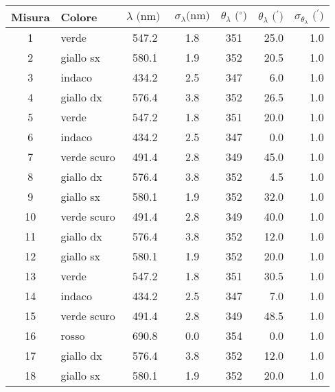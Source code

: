 \begin{table}[!htbp]
    {\par\centering
    \begin{tabular}{clcccrr}
        \hline
            Misura & 
            Colore & 
            $\lambda \text{ (nm) }$ & 
            $\sigma_{\lambda} \text{(nm)}$ & 
            $\theta_{\lambda} \text{ ($^{\circ}$)}$ & 
            $\theta_{\lambda} \text{ ($^{\prime}$)}$ & 
            $\sigma_{\theta_{\lambda}} \text{ ($^{\prime}$)}$ \\
        \hline
            1   &   verde        &   547.2  & 1.8 &  351 &   25.0  & 1.0  \\
            2   &   giallo sx    &   580.1  & 1.9 &  352 &   20.5  & 1.0  \\
            3   &   indaco       &   434.2  & 2.5 &  347 &   6.0   & 1.0  \\
            4   &   giallo dx    &   576.4  & 3.8 &  352 &   26.5  & 1.0  \\
            5   &   verde        &   547.2  & 1.8 &  351 &   20.0  & 1.0  \\
            6   &   indaco       &   434.2  & 2.5 &  347 &   0.0   & 1.0  \\
            7   &   verde scuro  &   491.4  & 2.8 &  349 &   45.0  & 1.0  \\
            8   &   giallo dx    &   576.4  & 3.8 &  352 &   4.5   & 1.0  \\
            9   &   giallo sx    &   580.1  & 1.9 &  352 &   32.0  & 1.0  \\
            10  &   verde scuro  &   491.4  & 2.8 &  349 &   40.0  & 1.0  \\
            11  &   giallo dx    &   576.4  & 3.8 &  352 &   12.0  & 1.0  \\
            12  &   giallo sx    &   580.1  & 1.9 &  352 &   20.0  & 1.0  \\
            13  &   verde        &   547.2  & 1.8 &  351 &   30.5  & 1.0  \\
            14  &   indaco       &   434.2  & 2.5 &  347 &   7.0   & 1.0  \\
            15  &   verde scuro  &   491.4  & 2.8 &  349 &   48.5  & 1.0  \\
            16  &   rosso        &   690.8  & 0.0 &  354 &   0.0   & 1.0  \\
            17  &   giallo dx    &   576.4  & 3.8 &  352 &   12.0  & 1.0  \\
            18  &   giallo sx    &   580.1  & 1.9 &  352 &   20.0  & 1.0  \\

\end{tabular}}
\end{table}
